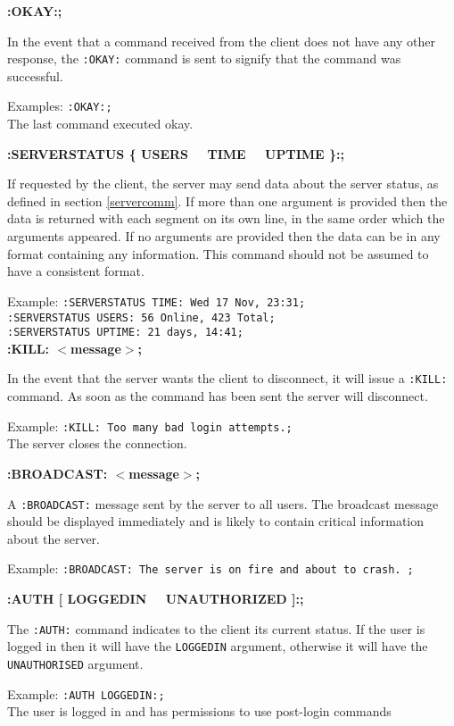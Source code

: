 {\bf :OKAY:;}

In the event that a command received from the client does not have any other response, the \texttt{:OKAY:} command is sent to signify that the command was successful.

Examples:
\texttt{:OKAY:;}\\
The last command executed okay.

{\bf :SERVERSTATUS \{ USERS \ \vline \ TIME \ \vline \ UPTIME \}:;}

If requested by the client, the server may send data about the server status, as defined in section \ref{servercomm}. If more than one argument is provided then the data is returned with each segment on its own line, in the same order which the arguments appeared. If no arguments are provided then the data can be in any format containing any information. This command should not be assumed to have a consistent format.

Example:
\texttt{:SERVERSTATUS TIME: Wed 17 Nov, 23:31;} \\
\texttt{:SERVERSTATUS USERS: 56 Online, 423 Total;} \\
\texttt{:SERVERSTATUS UPTIME: 21 days, 14:41;} \\

{\bf :KILL: $<$message$>$;}

In the event that the server wants the client to disconnect, it will issue a \texttt{:KILL:} command. As soon as the command has been sent the server will disconnect. 

Example:
\texttt{:KILL: Too many bad login attempts.;}\\
The server closes the connection.

{\bf :BROADCAST: $<$message$>$;}

A \texttt{:BROADCAST:} message sent by the server to all users. The broadcast message should be displayed immediately and is likely to contain critical information about the server.

Example:
\texttt{:BROADCAST: The server is on fire and about to crash. ;}

{\bf :AUTH [ LOGGEDIN \ \vline \ UNAUTHORIZED ]:;}

The \texttt{:AUTH:} command indicates to the client its current status. If the user is logged in then it will have the \texttt{LOGGEDIN} argument, otherwise it will have the \texttt{UNAUTHORISED} argument.

Example:
\texttt{:AUTH LOGGEDIN:;}\\
The user is logged in and has permissions to use post-login commands

